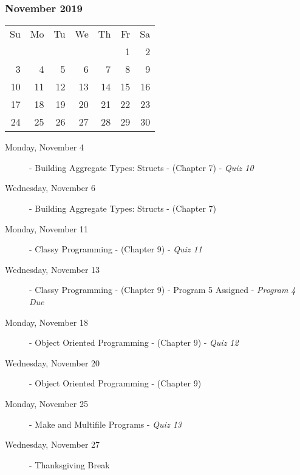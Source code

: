 \subsubsection*{November 2019}
\begin{tabular}{rrrrrrr}
Su & Mo & Tu & We & Th & Fr & Sa\\
   &    &    &    &    &  1 &  2\\
 3 &  4 &  5 &  6 &  7 &  8 &  9\\
10 & 11 & 12 & 13 & 14 & 15 & 16\\
17 & 18 & 19 & 20 & 21 & 22 & 23\\
24 & 25 & 26 & 27 & 28 & 29 & 30\\
\end{tabular}
\begin{description}

\item[Monday, November 4]
  - Building Aggregate Types: Structs
  \newline- (Chapter 7)
  \newline- {\em Quiz 10}
\item[Wednesday, November 6]
  - Building Aggregate Types: Structs
  \newline- (Chapter 7)

\item[Monday, November 11]
  - Classy Programming
  \newline- (Chapter 9)
  \newline- {\em Quiz 11}
\item[Wednesday, November 13]
  - Classy Programming
  \newline- (Chapter 9)
  \newline- Program 5 Assigned
  \newline- {\em Program 4 Due}

\item[Monday, November 18]
  - Object Oriented Programming
  \newline- (Chapter 9)
  \newline- {\em Quiz 12}
\item[Wednesday, November 20]
  - Object Oriented Programming
  \newline- (Chapter 9)

\item[Monday, November 25] 
  - Make and Multifile Programs
  \newline- {\em Quiz 13}
\item[Wednesday, November 27] - Thanksgiving Break
\end{description}
\hrulefill

